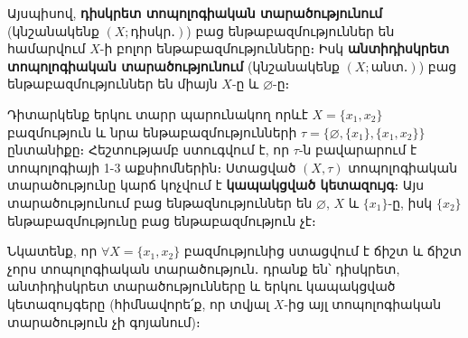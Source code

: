 \documentclass[./main.tex]{subfiles}
\begin{document}
Այսպիսով, \textbf{դիսկրետ տոպոլոգիական տարածությունում} (կնշանակենք \linebreak $(X;\textbf{դիսկր․})$) բաց ենթաբազմութ\-յուն\-ներ են համարվում $X$-ի բոլոր ենթաբազմու\-թյունները։ Իսկ \textbf{անտի\-դիսկրետ տոպո\-լոգիա\-կան տարածությունում} (կնշանակենք \linebreak $(X; \textbf{անտ․})$) բաց ենթաբազ\-մություններ են միայն $X$-ը և $\varnothing$-ը։


\begin{example}
Դիտարկենք երկու տարր պարունակող որևէ $X=\{x_1,x_2\}$ բազմու\-թյուն և  նրա ենթաբազմությունների  $\tau=\{ \varnothing,\{x_1\},\{x_1,x_2\}\}$ ընտանիքը։ Հեշտու\-թյամբ ստուգվում է, որ $\tau$-ն բավարարում է տոպոլոգիայի 1-3 աքսիոմներին։ Ստաց\-ված $(X,\tau)$ տոպոլոգիական տարածությունը կարճ կոչվում է \textbf{կապակցված կետա\-զույգ}։ Այս տարածությունում բաց ենթազնություններ են $\varnothing$, $X$ և $\{x_1\}$-ը, իսկ $\{x_2\}$ ենթաբազմությունը բաց ենթաբազմություն չէ։

\par Նկատենք, որ $\forall X=\{x_1,x_2\}$ բազմությունից ստացվում է ճիշտ և ճիշտ չորս տոպոլոգիական տարածություն․ դրանք են՝ դիսկրետ, անտիդիսկրետ տարածու\-թյուն\-ները և երկու կապակցված կետազույգերը (հիմնավորե՛ք, որ տվյալ $X$-ից այլ տոպոլոգիական տարածություն չի գոյանում)։
\end{example}
\end{document}
